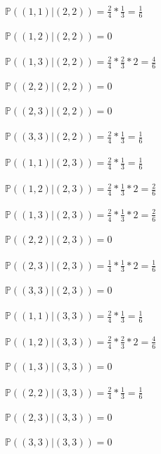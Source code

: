 \documentclass{article}
\begin{document}
$\mathbb{P}((1,1) | (2,2)) = \frac{2}{4} * \frac{1}{3} = \frac{1}{6}$\\ \\
$\mathbb{P}((1,2) | (2,2)) = 0$\\ \\
$\mathbb{P}((1,3) | (2,2)) = \frac{2}{4} * \frac{2}{3} *2= \frac{4}{6}$\\ \\
$\mathbb{P}((2,2) | (2,2)) = 0$\\ \\
$\mathbb{P}((2,3) | (2,2)) = 0$\\ \\
$\mathbb{P}((3,3) | (2,2)) = \frac{2}{4} * \frac{1}{3} = \frac{1}{6}$\\ \\

$\mathbb{P}((1,1) | (2,3)) = \frac{2}{4} * \frac{1}{3} = \frac{1}{6}$\\ \\
$\mathbb{P}((1,2) | (2,3)) = \frac{2}{4} * \frac{1}{3} *2 = \frac{2}{6}$\\ \\
$\mathbb{P}((1,3) | (2,3)) = \frac{2}{4} * \frac{1}{3} *2= \frac{2}{6}$\\ \\
$\mathbb{P}((2,2) | (2,3)) = 0$\\ \\
$\mathbb{P}((2,3) | (2,3)) = \frac{1}{4} * \frac{1}{3} *2= \frac{1}{6}$\\ \\
$\mathbb{P}((3,3) | (2,3)) = 0$\\ \\

$\mathbb{P}((1,1) | (3,3)) = \frac{2}{4} * \frac{1}{3} = \frac{1}{6}$\\ \\
$\mathbb{P}((1,2) | (3,3)) = \frac{2}{4} * \frac{2}{3} *2 = \frac{4}{6}$\\ \\
$\mathbb{P}((1,3) | (3,3)) = 0$\\ \\
$\mathbb{P}((2,2) | (3,3)) = \frac{2}{4} * \frac{1}{3} = \frac{1}{6}$\\ \\
$\mathbb{P}((2,3) | (3,3)) = 0$\\ \\
$\mathbb{P}((3,3) | (3,3)) = 0$\\ \\
\end{document}
